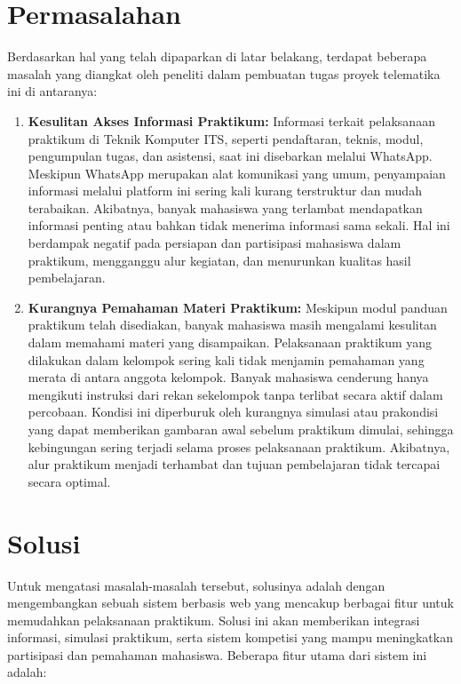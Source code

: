\section{Permasalahan}

Berdasarkan hal yang telah dipaparkan di latar belakang, terdapat beberapa masalah yang diangkat oleh peneliti dalam pembuatan tugas proyek telematika ini di antaranya:

\begin{enumerate}
\item \textbf{Kesulitan Akses Informasi Praktikum:} Informasi terkait pelaksanaan praktikum di Teknik Komputer ITS, seperti pendaftaran, teknis, modul, pengumpulan tugas, dan asistensi, saat ini disebarkan melalui WhatsApp. Meskipun WhatsApp merupakan alat komunikasi yang umum, penyampaian informasi melalui platform ini sering kali kurang terstruktur dan mudah terabaikan. Akibatnya, banyak mahasiswa yang terlambat mendapatkan informasi penting atau bahkan tidak menerima informasi sama sekali. Hal ini berdampak negatif pada persiapan dan partisipasi mahasiswa dalam praktikum, mengganggu alur kegiatan, dan menurunkan kualitas hasil pembelajaran.

\item \textbf{Kurangnya Pemahaman Materi Praktikum:} Meskipun modul panduan praktikum telah disediakan, banyak mahasiswa masih mengalami kesulitan dalam memahami materi yang disampaikan. Pelaksanaan praktikum yang dilakukan dalam kelompok sering kali tidak menjamin pemahaman yang merata di antara anggota kelompok. Banyak mahasiswa cenderung hanya mengikuti instruksi dari rekan sekelompok tanpa terlibat secara aktif dalam percobaan. Kondisi ini diperburuk oleh kurangnya simulasi atau prakondisi yang dapat memberikan gambaran awal sebelum praktikum dimulai, sehingga kebingungan sering terjadi selama proses pelaksanaan praktikum. Akibatnya, alur praktikum menjadi terhambat dan tujuan pembelajaran tidak tercapai secara optimal.
\end{enumerate}

\section{Solusi}

Untuk mengatasi masalah-masalah tersebut, solusinya adalah dengan mengembangkan sebuah sistem berbasis web yang mencakup berbagai fitur untuk memudahkan pelaksanaan praktikum. Solusi ini akan memberikan integrasi informasi, simulasi praktikum, serta sistem kompetisi yang mampu meningkatkan partisipasi dan pemahaman mahasiswa. Beberapa fitur utama dari sistem ini adalah:

